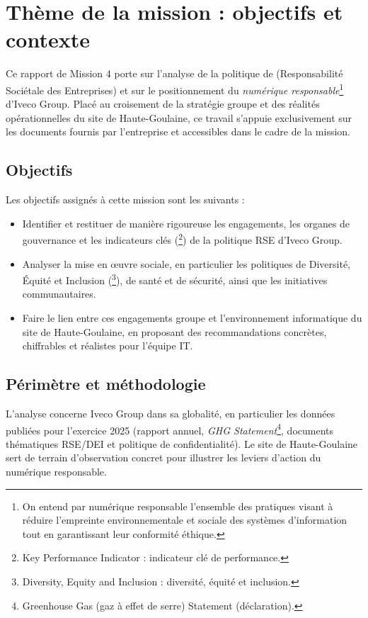 \section*{Thème de la mission : objectifs et contexte}

Ce rapport de Mission 4 porte sur l'analyse de la politique de  (Responsabilité Sociétale des Entreprises) et sur le positionnement du \textit{numérique responsable}\footnote{On entend par numérique responsable l'ensemble des pratiques visant à réduire l'empreinte environnementale et sociale des systèmes d'information tout en garantissant leur conformité éthique.} d'Iveco Group. Placé au croisement de la stratégie groupe et des réalités opérationnelles du site de Haute-Goulaine, ce travail s'appuie exclusivement sur les documents fournis par l'entreprise et accessibles dans le cadre de la mission.

\subsection*{Objectifs}

Les objectifs assignés à cette mission sont les suivants :

\begin{itemize}
    \item Identifier et restituer de manière rigoureuse les engagements, les organes de gouvernance et les indicateurs clés (\footnote{Key Performance Indicator : indicateur clé de performance.}) de la politique RSE d'Iveco Group.
    \item Analyser la mise en \oe{}uvre sociale, en particulier les politiques de Diversité, Équité et Inclusion (\footnote{Diversity, Equity and Inclusion : diversité, équité et inclusion.}), de santé et de sécurité, ainsi que les initiatives communautaires.
    \item Faire le lien entre ces engagements groupe et l'environnement informatique du site de Haute-Goulaine, en proposant des recommandations concrètes, chiffrables et réalistes pour l'équipe IT.
\end{itemize}

\subsection*{Périmètre et méthodologie}

L'analyse concerne Iveco Group dans sa globalité, en particulier les données publiées pour l'exercice 2025 (rapport annuel, \textit{GHG Statement}\footnote{Greenhouse Gas (gaz à effet de serre) Statement (déclaration).}, documents thématiques RSE/DEI et politique de confidentialité). Le site de Haute-Goulaine sert de terrain d'observation concret pour illustrer les leviers d'action du numérique responsable.

